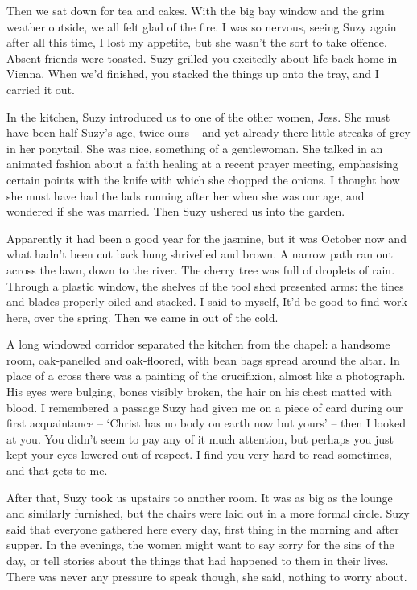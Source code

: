 \documentclass{amsbook}
\newcommand{\poeticmarginnote}[1]{\marginnote{\footnotesize #1}}
\begin{document}
Then we sat down for tea and cakes. With the big bay window and the grim weather outside, we all felt glad of the fire. I was so nervous, seeing Suzy again after all this time, I lost my appetite, but she wasn't the sort to take offence. Absent friends were toasted. Suzy grilled you excitedly about life back home in Vienna. When we'd finished, you stacked the things up onto the tray, and I carried it out.

In the kitchen, Suzy introduced us to one of the other women, Jess. She must have been half Suzy's age, twice ours -- and yet already there little streaks of grey in her ponytail. She was nice, something of a gentlewoman. She talked in an animated fashion about a faith healing at a recent prayer meeting, emphasising certain points with the knife with which she chopped the onions. I thought how she must have had the lads running after her when she was our age, and wondered if she was married. Then Suzy ushered us into the garden.

Apparently it had been a good year for the jasmine, but it was October now and what hadn't been cut back hung shrivelled and brown. A narrow path ran out across the lawn, down to the river. The cherry tree was full of droplets of rain. Through a plastic window, the shelves of the tool shed presented arms: the tines and blades properly oiled and stacked. I said to myself, It'd be good to find work here, over the spring. Then we came in out of the cold.

A long windowed corridor separated the kitchen from the chapel: a handsome room, oak-panelled and oak-floored, with bean bags spread around the altar. In place of a cross there was a painting of the crucifixion, almost like a photograph. His eyes were bulging, bones visibly broken, the hair on his chest matted with blood. I remembered a passage Suzy had given me on a piece of card during our first acquaintance -- `Christ\poeticmarginnote{Sta Teresa de \'Avila} has no body on earth now but yours' -- then I looked at you. You didn't seem to pay any of it much attention, but perhaps you just kept your eyes lowered out of respect. I find you very hard to read sometimes, and that gets to me.

After that, Suzy took us upstairs to another room. It was as big as the lounge and similarly furnished, but the chairs were laid out in a more formal circle. Suzy said that everyone gathered here every day, first thing in the morning and after supper. In the evenings, the women might want to say sorry for the sins of the day, or tell stories about the things that had happened to them in their lives. There was never any pressure to speak though, she said, nothing to worry about.
\end{document}
